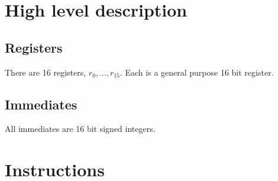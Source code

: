 \documentclass{scrartcl}
\begin{document}
\section*{High level description}
\subsection*{Registers}
There are 16 registers, \(r_0,\ldots,r_{15}\). Each is a general purpose 16 bit
register.
\subsection*{Immediates}
All immediates are 16 bit signed integers.

\section*{Instructions}
\end{document}
